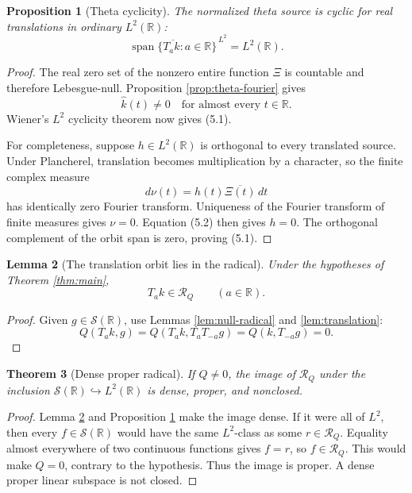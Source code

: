 \documentclass[11pt]{article}
\newtheorem{theorem}{Theorem}[section]
\newtheorem{proposition}[theorem]{Proposition}
\newtheorem{lemma}[theorem]{Lemma}
\newcommand{\R}{\mathbb R}
\newcommand{\cS}{\mathcal S}
\newcommand{\cR}{\mathcal R}
\newcommand{\Span}{\operatorname{span}}
\begin{document}
\begin{proposition}[Theta cyclicity]\label{prop:cyclic}
The normalized theta source is cyclic for real translations in ordinary \(L^2(\R)\):
\[
 \overline{\Span\{T_a k:a\in\R\}}^{\,L^2}=L^2(\R).
\tag{5.1}
\]
\end{proposition}

\begin{proof}
The real zero set of the nonzero entire function \(\Xi\) is countable and therefore
Lebesgue-null.  Proposition \ref{prop:theta-fourier} gives
\[
 \widehat k(t)\ne0\quad\text{for almost every }t\in\R.
\tag{5.2}
\]
Wiener's \(L^2\) cyclicity theorem \cite{Wiener1932} now gives (5.1).

For completeness, suppose \(h\in L^2(\R)\) is orthogonal to every translated source.  Under
Plancherel, translation becomes multiplication by a character, so the finite complex measure
\[
 d\nu(t)=h(t)\overline{\Xi(t)}\,dt
\tag{5.3}
\]
has identically zero Fourier transform.  Uniqueness of the Fourier transform of finite measures
gives \(\nu=0\).  Equation (5.2) then gives \(h=0\).  The orthogonal complement of the orbit span
is zero, proving (5.1).
\end{proof}

\begin{lemma}[The translation orbit lies in the radical]\label{lem:orbit-radical}
Under the hypotheses of Theorem \ref{thm:main},
\[
 T_a k\in\cR_Q\qquad(a\in\R).
\tag{5.4}
\]
\end{lemma}

\begin{proof}
Given \(g\in\cS(\R)\), use Lemmas \ref{lem:null-radical} and \ref{lem:translation}:
\[
 Q(T_a k,g)
 =Q(T_a k,T_aT_{-a}g)
 =Q(k,T_{-a}g)=0.
\]
\end{proof}

\begin{theorem}[Dense proper radical]\label{thm:dense-radical}
If \(Q\neq0\), the image of \(\cR_Q\) under the inclusion
\(\cS(\R)\hookrightarrow L^2(\R)\) is dense, proper, and nonclosed.
\end{theorem}

\begin{proof}
Lemma \ref{lem:orbit-radical} and Proposition \ref{prop:cyclic} make the image dense.  If it were
all of \(L^2\), then every \(f\in\cS(\R)\) would have the same \(L^2\)-class as some
\(r\in\cR_Q\).  Equality almost everywhere of two continuous functions gives \(f=r\), so
\(f\in\cR_Q\).  This would make \(Q=0\), contrary to the hypothesis.  Thus the image is proper.
A dense proper linear subspace is not closed.
\end{proof}
\end{document}

